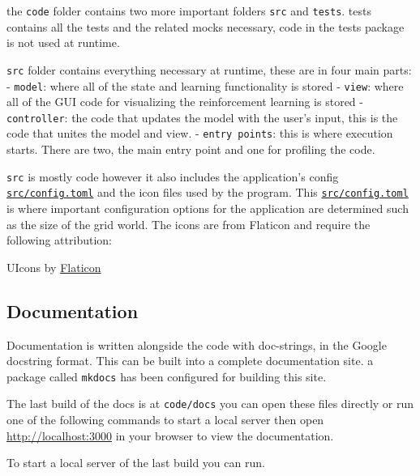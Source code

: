 the \texttt{code} folder contains two more important folders
\texttt{src} and \texttt{tests}. tests contains all the tests and the
related mocks necessary, code in the tests package is not used at
runtime.

\texttt{src} folder contains everything necessary at runtime, these are
in four main parts: - \texttt{model}: where all of the state and
learning functionality is stored - \texttt{view}: where all of the GUI
code for visualizing the reinforcement learning is stored -
\texttt{controller}: the code that updates the model with the user's
input, this is the code that unites the model and view. -
\texttt{entry\ points}: this is where execution starts. There are two,
the main entry point and one for profiling the code.

\texttt{src} is mostly code however it also includes the application's
config \href{./src/config.toml}{\texttt{src/config.toml}} and the icon
files used by the program. This
\href{./src/config.toml}{\texttt{src/config.toml}} is where important
configuration options for the application are determined such as the
size of the grid world. The icons are from Flaticon and require the
following attribution:

UIcons by \href{https://www.flaticon.com/uicons}{Flaticon}

\newpage
\hypertarget{documentation}{%
\subsection{Documentation}\label{documentation}}

Documentation is written alongside the code with doc-strings, in the
Google docstring format. This can be built into a complete documentation
site. a package called \texttt{mkdocs} has been configured for building
this site.

The last build of the docs is at \texttt{code/docs} you can open these
files directly or run one of the following commands to start a local
server then open \url{http://localhost:3000} in your browser to view the
documentation.

To start a local server of the last build you can run.

\begin{Shaded}
\begin{Highlighting}[]
\end{Highlighting}
\end{Shaded}

